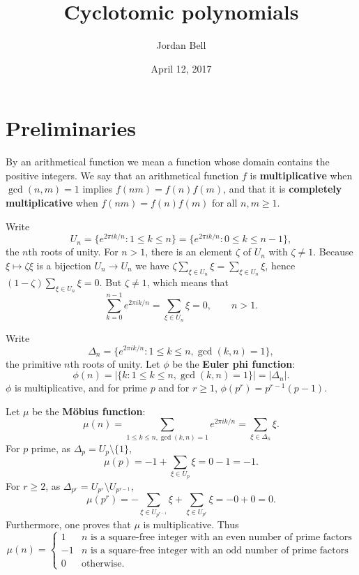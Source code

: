\documentclass{article}
\theoremstyle{definition}
\begin{document}
\title{Cyclotomic polynomials}
\author{Jordan Bell}
\date{April 12, 2017}

\maketitle

\section{Preliminaries}
By an arithmetical function we mean a function whose domain contains the positive integers. We say that an arithmetical function $f$ is
\textbf{multiplicative} when $\gcd(n,m)=1$ implies $f(nm)=f(n)f(m)$, and that it is \textbf{completely multiplicative} when $f(nm)=f(n)f(m)$ for all $n,m \geq 1$.

Write
\[
U_n=\{e^{2\pi ik/n}: 1 \leq k \leq n\} = \{e^{2\pi ik/n}: 0 \leq k \leq n-1\},
\]
 the  $n$th roots of unity. 
For $n>1$, there is an element  $\zeta$ of $U_n$ with $\zeta \neq 1$. Because $\xi \mapsto \zeta \xi$ is a bijection $U_n \to U_n$ we have
$\zeta \sum_{\xi \in U_n} \xi = \sum_{\xi \in U_n} \xi$,
hence $(1-\zeta) \sum_{\xi \in U_n} \xi = 0$. But $\zeta \neq 1$, which means that
\[
\sum_{k=0}^{n-1} e^{2\pi ik/n} = \sum_{\xi \in U_n} \xi = 0,\qquad n>1.
\]


Write
\[
\Delta_n = \{e^{2\pi ik/n}: 1 \leq k \leq n, \gcd(k,n)=1\},
\]
 the primitive $n$th roots
of unity. 
Let $\phi$ be the \textbf{Euler phi function}:
\[
\phi(n) = |\{k: 1 \leq k \leq n, \gcd(k,n)=1\}|=|\Delta_n|.
\]
$\phi$ is multiplicative, and for prime $p$ and for $r \geq 1$, $\phi(p^r)=p^{r-1}(p-1)$.



Let $\mu$ be the \textbf{M\"obius function}:
\[
\mu(n) =\sum_{1\le k\le n, \gcd(k,n)=1} e^{2\pi ik/n}
=
 \sum_{\xi \in \Delta_n} \xi.
\]
For $p$ prime, as $\Delta_p = U_p \setminus \{1\}$,
\[
\mu(p) = -1+\sum_{\xi \in U_p} \xi  = 0-1=-1.
\]
For $r \geq 2$, as $\Delta_{p^r} = U_{p^r} \setminus U_{p^{r-1}}$,
\[
\mu(p^r) =-\sum_{\xi \in U_{p^{r-1}}} \xi+ \sum_{\xi \in U_{p^r}} \xi = -0+0=0.
\]
Furthermore, one proves  that $\mu$ is multiplicative. Thus
\[
\mu(n) =
\begin{cases}
1&\textrm{$n$ is a square-free integer with an even number of prime factors}\\
-1&\textrm{$n$ is a square-free integer with an odd number of prime factors}\\
0&\textrm{otherwise}.
\end{cases}
\]
\end{document}
